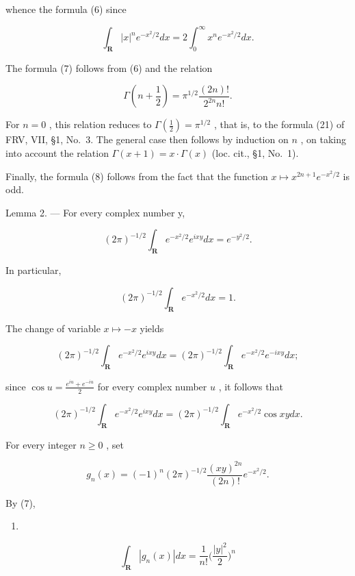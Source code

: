 whence the formula (6) since

\[
\int_ {\mathbf {R}} | x | ^ {n} e ^ {- x ^ {2} / 2} d x = 2 \int_ {0} ^ {\infty} x ^ {n} e ^ {- x ^ {2} / 2} d x.
\]

The formula (7) follows from (6) and the relation

\[
\Gamma \left(n + \frac {1}{2}\right) = \pi^ {1 / 2} \frac {(2 n) !}{2 ^ {2 n} n !}.\tag{10}
\]

For \(n = 0\) , this relation reduces to \(\Gamma(\frac{1}{2}) = \pi^{1/2}\) , that is, to the formula (21) of FRV, VII, §1, No.~3. The general case then follows by induction on \(n\) , on taking into account the relation \(\Gamma(x + 1) = x \cdot \Gamma(x)\) (loc. cit., §1, No.~1).

Finally, the formula (8) follows from the fact that the function \(x \mapsto x^{2n+1}e^{-x^2/2}\) is odd.

Lemma 2. --- For every complex number y,

\[
(2 \pi) ^ {- 1 / 2} \int_ {\mathbf {R}} e ^ {- x ^ {2} / 2} e ^ {i x y} d x = e ^ {- y ^ {2} / 2}.\tag{11}
\]

In particular,

\[
(2 \pi) ^ {- 1 / 2} \int_ {\mathbf {R}} e ^ {- x ^ {2} / 2} d x = 1.
\]

The change of variable \(x \mapsto -x\) yields

\[
(2 \pi) ^ {- 1 / 2} \int_ {\mathbf {R}} e ^ {- x ^ {2} / 2} e ^ {i x y} d x = (2 \pi) ^ {- 1 / 2} \int_ {\mathbf {R}} e ^ {- x ^ {2} / 2} e ^ {- i x y} d x;
\]

since \(\cos u = \frac{e^{iu} + e^{-iu}}{2}\) for every complex number \(u\) , it follows that

\[
(2 \pi) ^ {- 1 / 2} \int_ {\mathbf {R}} e ^ {- x ^ {2} / 2} e ^ {i x y} d x = (2 \pi) ^ {- 1 / 2} \int_ {\mathbf {R}} e ^ {- x ^ {2} / 2} \cos x y d x.\tag{12}
\]

For every integer \(n \geqslant 0\) , set

\[
g _ {n} (x) = (- 1) ^ {n} (2 \pi) ^ {- 1 / 2} \frac {(x y) ^ {2 n}}{(2 n) !} e ^ {- x ^ {2} / 2}.
\]

By (7),

\begin{enumerate}
\def\labelenumi{(\arabic{enumi})}
\setcounter{enumi}{12}
\tightlist
\item
\end{enumerate}

\[
\int_ {\mathbf {R}} | g _ {n} (x) | d x = \frac {1}{n !} \biggl (\frac {| y | ^ {2}}{2} \biggr) ^ {n}\tag{14}
\]

